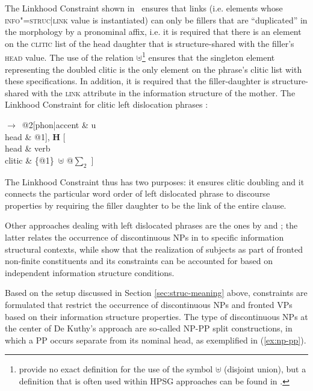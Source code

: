 \documentclass[output=paper]{langsci/langscibook}
\begin{document}
The Linkhood Constraint shown in~
ensures that links (i.e. elements whose \textsc{info"=struc|link} value
is instantiated) can only be fillers that are ``duplicated'' in the
morphology by a pronominal affix, i.e. it is required that there is an
element  on the \textsc{clitic} list of the head daughter that is structure-shared with the filler's \textsc{head} value. The use of the  relation $\uplus$\footnote{\citet{AK2002a} provide no exact definition for the use of the symbol $\uplus$ (disjoint union), but a definition that is often used within HPSG approaches can be found in \citet{Manandhar94b-u}.} ensures that the singleton element  representing the doubled clitic is the only element on the phrase's clitic list with these specifications. In addition, it is required that the filler-daughter  is structure-shared with the \textsc{link} attribute in the information structure of the mother. 
\ea
The Linkhood Constraint for clitic left dislocation phrases \citep[238]{AK2002a}:\\
  \centering
  \begin{avm}
$\to$\ 
  @2[phon|accent & u\\
     head & @1], \textbf{H} [\\
                              head & verb\\
                              clitic & \{@1\}\ $\uplus$ @{$\sum_2$} ]
\end{avm}
  \label{fig:clld-constraint}
\z
The Linkhood Constraint thus has two purposes: it ensures clitic
doubling and it connects the particular word order of left dislocated
phrase to discourse properties by requiring the filler daughter to be
the link of the entire clause.

Other approaches dealing with left dislocated phrases are the ones by
\cite{deKuthy2002a} and \citet{dKM2003a}; the latter relates the
occurrence of discontinuous NPs in \ili{German} to specific
information structural contexts, while \citet{dKM2003a} show that the
realization of subjects as part of fronted non-finite constituents and
its constraints can be accounted for based on independent
information structure conditions.

Based on the setup discussed in Section \ref{sec:struc-meaning} above,
constraints are formulated that restrict the occurrence of
discontinuous NPs and fronted VPs based on their information structure
properties. The type of discontinuous NPs at the center of De
Kuthy's approach are so-called NP-PP split constructions, in which a PP
occurs separate from its nominal head, as exemplified in
(\ref{ex:np-pp}).
\end{document}
